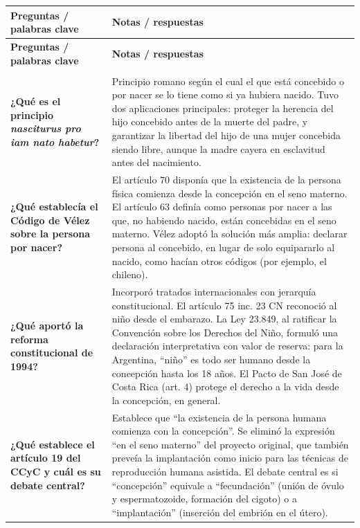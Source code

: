 \documentclass[12pt,oneside]{book}
\begin{document}
\begin{longtable}{
    >{\raggedright\arraybackslash}p{}
    >{\raggedright\arraybackslash}p{}
}
\toprule
\textbf{Preguntas / palabras clave} &
\textbf{Notas / respuestas} \\
\midrule
\endfirsthead

\toprule
\textbf{Preguntas / palabras clave} &
\textbf{Notas / respuestas} \\
\midrule
\endhead

\midrule
\multicolumn{2}{r}{\textit{continúa en la página siguiente}} \\
\endfoot

\bottomrule
\endlastfoot

\textbf{¿Qué es el principio \textit{nasciturus pro iam nato habetur}?} &
Principio romano según el cual el que está concebido o por nacer se lo tiene como si ya hubiera nacido. Tuvo dos aplicaciones principales: proteger la herencia del hijo concebido antes de la muerte del padre, y garantizar la libertad del hijo de una mujer concebida siendo libre, aunque la madre cayera en esclavitud antes del nacimiento. \\

\textbf{¿Qué establecía el Código de Vélez sobre la persona por nacer?} &
El artículo 70 disponía que la existencia de la persona física comienza desde la concepción en el seno materno. El artículo 63 definía como personas por nacer a las que, no habiendo nacido, están concebidas en el seno materno. Vélez adoptó la solución más amplia: declarar persona al concebido, en lugar de solo equipararlo al nacido, como hacían otros códigos (por ejemplo, el chileno). \\

\textbf{¿Qué aportó la reforma constitucional de 1994?} &
Incorporó tratados internacionales con jerarquía constitucional. El artículo 75 inc. 23 CN reconoció al niño desde el embarazo. La Ley 23.849, al ratificar la Convención sobre los Derechos del Niño, formuló una declaración interpretativa con valor de reserva: para la Argentina, ``niño'' es todo ser humano desde la concepción hasta los 18 años. El Pacto de San José de Costa Rica (art. 4) protege el derecho a la vida desde la concepción, en general. \\

\textbf{¿Qué establece el artículo 19 del CCyC y cuál es su debate central?} &
Establece que ``la existencia de la persona humana comienza con la concepción''. Se eliminó la expresión ``en el seno materno'' del proyecto original, que también preveía la implantación como inicio para las técnicas de reproducción humana asistida. El debate central es si ``concepción'' equivale a ``fecundación'' (unión de óvulo y espermatozoide, formación del cigoto) o a ``implantación'' (inserción del embrión en el útero). \\


\end{longtable}
\end{document}

